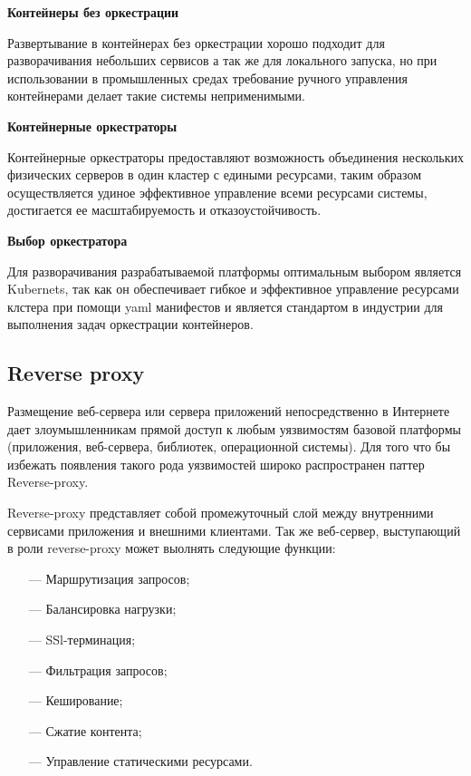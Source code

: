 {\bf Контейнеры без оркестрации}

Развертывание в контейнерах без оркестрации хорошо подходит для разворачивания небольших сервисов а так же для локального запуска, но при использовании в промышленных средах требование ручного управления контейнерами делает такие системы неприменимыми.

{\bf Контейнерные оркестраторы}

Контейнерные оркестраторы предоставляют возможность объединения нескольких физических серверов в один кластер с едиными ресурсами, таким образом осуществляется удиное эффективное управление всеми ресурсами системы, достигается ее масштабируемость и отказоустойчивость. 

{\bf Выбор оркестратора}

Для разворачивания разрабатываемой платформы оптимальным выбором является Kubernets, так как он обеспечивает гибкое и эффективное управление ресурсами клстера при помощи yaml манифестов и является стандартом в индустрии для выполнения задач оркестрации контейнеров.

\subsection{Reverse proxy}

Размещение веб-сервера или сервера приложений непосредственно в Интернете дает злоумышленникам прямой доступ к любым уязвимостям базовой платформы (приложения, веб-сервера, библиотек, операционной системы). Для того что бы избежать появления такого рода уязвимостей широко распространен паттер Reverse-proxy\cite{sommerlad2003reverse}.

Reverse-proxy представляет собой промежуточный слой между внутренними сервисами приложения и внешними клиентами.
Так же веб-сервер, выступающий в роли reverse-proxy может выолнять следующие функции:

\begin{itemize}
  \item[---] Маршрутизация запросов;
  \item[---] Балансировка нагрузки;
  \item[---] SSl-терминация;
  \item[---] Фильтрация запросов;
  \item[---] Кеширование;
  \item[---] Сжатие контента;
  \item[---] Управление статическими ресурсами. 
\end{itemize}

